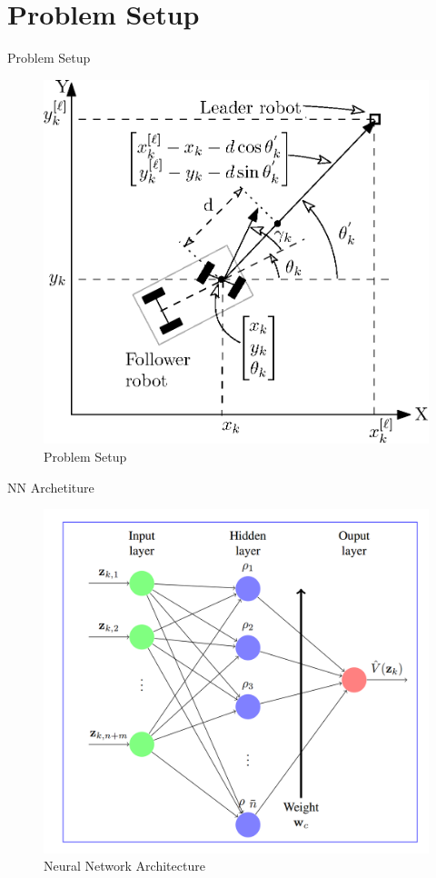 \documentclass{beamer}
\begin{document}
\section{Problem Setup}
\begin{frame}{Problem Setup}

\begin{figure}
\includegraphics[scale=0.5]{figs/ipe/LF-Setup.eps}
\caption{Problem Setup}
\end{figure}

\end{frame}

\begin{frame}{NN Archetiture}
\begin{figure}
\includegraphics[scale=0.2]{figs/img/criticNeuralNetwork.png}
\caption{Neural Network Architecture}
\end{figure}
\end{frame}
\end{document}
